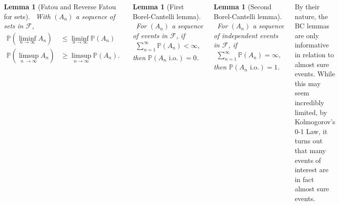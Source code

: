 \documentclass{tikzposter} %
\newtheorem{lemma}[theorem]{Lemma}
\newtheorem{definition}{Definition}
\begin{document}
\begin{columns}
{{      \begin{lemma}[Fatou and Reverse Fatou for sets]
      \ With $(A_{n})$ a sequence of sets in $\mathcal{F}$,
      \begin{align*}
        \mathbb{P}(\liminf_{n \to \infty} A_{n}) &\le \liminf_{n \to \infty} \mathbb{P}(A_{n}) \\
        \mathbb{P}(\limsup_{n\ \to \infty} A_{n}) &\ge \limsup_{n \to \infty} \mathbb{P}(A_{n}).
      \end{align*}
      \end{lemma}
      \hphantom{}

      \begin{lemma}[First Borel-Cantelli lemma]
        \ For $(A_{n})$ a sequence of events in $\mathcal{F}$, if
        \begin{align*}
          \sum_{n = 1}^{\infty} \mathbb{P}(A_{n}) < \infty,
        \end{align*}
        then $\mathbb{P}(A_{n} \text{ i.o.}) = 0$.
      \end{lemma}
      \hphantom{}

      \begin{lemma}[Second Borel-Cantelli lemma]
      \ For $(A_{n})$ a sequence of independent events in $\mathcal{F}$, if
      \begin{align*}
        \sum_{n=1}^{\infty} \mathbb{P}(A_{n}) = \infty,
      \end{align*}
      then $\mathbb{P}(A_{n} \text{ i.o.}) = 1$.
      \end{lemma}
      \hphantom{}

      By their nature, the BC lemmas are only informative in relation to almost sure events. While this may seem incredibly limited, by Kolmogorov's 0-1 Law, it turns out that many events of interest are in fact almost sure events.
    }
  }
\end{columns}
\end{document}
